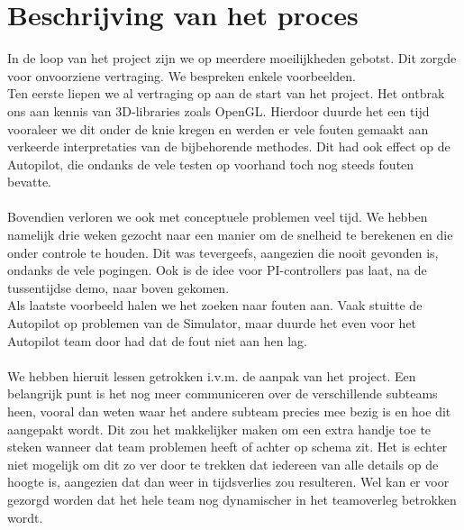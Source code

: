 \documentclass[]{penoverslag}
\begin{document}
\maketitlepage




\newpage\makeappendix

\section{Beschrijving van het proces}
In de loop van het project zijn we op meerdere moeilijkheden gebotst. Dit zorgde voor onvoorziene vertraging. We bespreken enkele voorbeelden.
\\
Ten eerste liepen we al vertraging op aan de start van het project. Het ontbrak ons aan kennis van 3D-libraries zoals OpenGL. Hierdoor duurde het een tijd vooraleer we dit onder de knie kregen en werden er vele fouten gemaakt aan verkeerde interpretaties van de bijbehorende methodes. Dit had ook effect op de Autopilot, die ondanks de vele testen op voorhand toch nog steeds fouten bevatte.
\\
\\
Bovendien verloren we ook met conceptuele problemen veel tijd. We hebben namelijk drie weken gezocht naar een manier om de snelheid te berekenen en die onder controle te houden. Dit was tevergeefs, aangezien die nooit gevonden is, ondanks de vele pogingen. Ook is de idee voor PI-controllers pas laat, na de tussentijdse demo, naar boven gekomen.
\\
Als laatste voorbeeld halen we het zoeken naar fouten aan. Vaak stuitte de Autopilot op problemen van de Simulator, maar duurde het even voor het Autopilot team door had dat de fout niet aan hen lag.
\\
\\
We hebben hieruit lessen getrokken i.v.m. de aanpak van het project. 
Een belangrijk punt is het nog meer communiceren over de verschillende subteams heen, vooral dan weten waar het andere subteam precies mee bezig is en hoe dit aangepakt wordt. Dit zou het makkelijker maken om een extra handje toe te steken wanneer dat team problemen heeft of achter op schema zit. Het is echter niet mogelijk om dit zo ver door te trekken dat iedereen van alle details op de hoogte is, aangezien dat dan weer in tijdsverlies zou resulteren. Wel kan er voor gezorgd worden dat het hele team nog dynamischer in het teamoverleg betrokken wordt.
\end{document}
